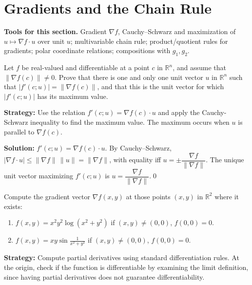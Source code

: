 \section{Gradients and the Chain Rule}

\noindent\textbf{Tools for this section.} Gradient $\nabla f$, Cauchy–Schwarz and maximization of $u\mapsto \nabla f\cdot u$ over unit $u$; multivariable chain rule; product/quotient rules for gradients; polar coordinate relations; compositions with $g_1,g_2$.



\begin{problembox}
Let \( f \) be real-valued and differentiable at a point \( c \) in \( \mathbb{R}^n \), and assume that \( \| \nabla f(c) \| \neq 0 \). Prove that there is one and only one unit vector \( u \) in \( \mathbb{R}^n \) such that \( |f'(c; u)| = \| \nabla f(c) \| \), and that this is the unit vector for which \( |f'(c; u)| \) has its maximum value.
\end{problembox}

\noindent\textbf{Strategy:} Use the relation \( f'(c; u) = \nabla f(c) \cdot u \) and apply the Cauchy-Schwarz inequality to find the maximum value. The maximum occurs when \( u \) is parallel to \( \nabla f(c) \).

\bigskip\noindent\textbf{Solution:}
$f'(c;u)=\nabla f(c)\cdot u$. By Cauchy–Schwarz, $|\nabla f\cdot u|\le\|\nabla f\|\,\|u\|=\|\nabla f\|$, with equality iff $u=\pm\dfrac{\nabla f}{\|\nabla f\|}$. The unique unit vector maximizing $f'(c;u)$ is $u=\dfrac{\nabla f}{\|\nabla f\|}$.\qed


\begin{problembox}
Compute the gradient vector \( \nabla f(x, y) \) at those points \( (x, y) \) in \( \mathbb{R}^2 \) where it exists:
\begin{enumerate}[label=(\alph*)]
\item \( f(x, y) = x^2 y^2 \log (x^2 + y^2) \) if \( (x, y) \ne (0, 0) \), \( f(0, 0) = 0 \).
\item \( f(x, y) = xy \sin \frac{1}{x^2 + y^2} \) if \( (x, y) \ne (0, 0) \), \( f(0, 0) = 0 \).
\end{enumerate}
\end{problembox}

\noindent\textbf{Strategy:} Compute partial derivatives using standard differentiation rules. At the origin, check if the function is differentiable by examining the limit definition, since having partial derivatives does not guarantee differentiability.

